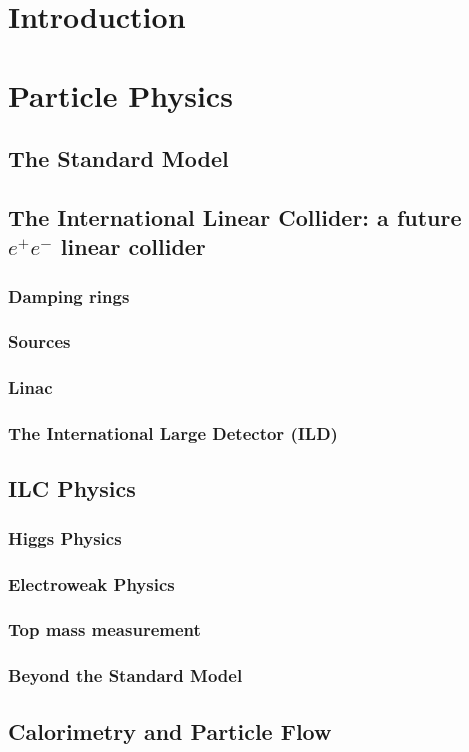 \chapter*{Introduction}

\chapter{Particle Physics}
\section{The Standard Model}
\section{The International Linear Collider: a future $e^+e^-$ linear collider}
\subsection{Damping rings}
\subsection{Sources}
\subsection{Linac}
\subsection{The International Large Detector (ILD)}
\section{ILC Physics}
\subsection{Higgs Physics}
\subsection{Electroweak Physics}
\subsection{Top mass measurement}
\subsection{Beyond the Standard Model}
\section{Calorimetry and Particle Flow}
